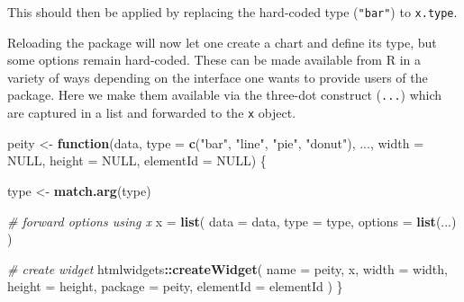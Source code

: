\documentclass[
  10pt,
]{krantz}
\makeatletter
\newenvironment{Shaded}{\begin{snugshade}}{\end{snugshade}}
\newcommand{\AttributeTok}[1]{\textcolor[rgb]{0.61,0.61,0.61}{#1}}
\newcommand{\CommentTok}[1]{\textcolor[rgb]{0.37,0.37,0.37}{\textit{#1}}}
\newcommand{\ControlFlowTok}[1]{\textcolor[rgb]{0.27,0.27,0.27}{\textbf{#1}}}
\newcommand{\DataTypeTok}[1]{\textcolor[rgb]{0.27,0.27,0.27}{#1}}
\newcommand{\KeywordTok}[1]{\textcolor[rgb]{0.27,0.27,0.27}{\textbf{#1}}}
\newcommand{\NormalTok}[1]{#1}
\newcommand{\OperatorTok}[1]{\textcolor[rgb]{0.43,0.43,0.43}{\textbf{#1}}}
\newcommand{\OtherTok}[1]{\textcolor[rgb]{0.37,0.37,0.37}{#1}}
\newcommand{\StringTok}[1]{\textcolor[rgb]{0.5,0.5,0.5}{#1}}
\newcommand{\VariableTok}[1]{\textcolor[rgb]{0,0,0}{#1}}
\newenvironment{kframe}{%
\medskip{}
\setlength{\fboxsep}{.8em}
 \def\at@end@of@kframe{}%
 \ifinner\ifhmode%
  \def\at@end@of@kframe{\end{minipage}}%
  \begin{minipage}{\columnwidth}%
 \fi\fi%
 \def\FrameCommand##1{\hskip\@totalleftmargin \hskip-\fboxsep
 \colorbox{shadecolor}{##1}\hskip-\fboxsep
     \hskip-\linewidth \hskip-\@totalleftmargin \hskip\columnwidth}%
 \MakeFramed {\advance\hsize-\width
   \@totalleftmargin\z@ \linewidth\hsize
   \@setminipage}}%
 {\par\unskip\endMakeFramed%
 \at@end@of@kframe}
\renewenvironment{Shaded}{\begin{kframe}}{\end{kframe}}
\makeatother
\begin{document}
This should then be applied by replacing the hard-coded type (\texttt{"bar"}) to \texttt{x.type}.

\begin{Shaded}
\end{Shaded}

Reloading the package will now let one create a chart and define its type, but some options remain hard-coded. These can be made available from R in a variety of ways depending on the interface one wants to provide users of the package. Here we make them available via the three-dot construct (\texttt{...}) which are captured in a list and forwarded to the \texttt{x} object.

\begin{Shaded}
\begin{Highlighting}[]
\NormalTok{peity <{-}}\StringTok{ }\ControlFlowTok{function}\NormalTok{(data, }\DataTypeTok{type =} \KeywordTok{c}\NormalTok{(}\StringTok{"bar"}\NormalTok{, }\StringTok{"line"}\NormalTok{, }\StringTok{"pie"}\NormalTok{, }\StringTok{"donut"}\NormalTok{), }
\NormalTok{  ..., }\DataTypeTok{width =} \OtherTok{NULL}\NormalTok{, }\DataTypeTok{height =} \OtherTok{NULL}\NormalTok{, }\DataTypeTok{elementId =} \OtherTok{NULL}\NormalTok{) \{}

\NormalTok{  type <{-}}\StringTok{ }\KeywordTok{match.arg}\NormalTok{(type)}

  \CommentTok{\# forward options using x}
\NormalTok{  x =}\StringTok{ }\KeywordTok{list}\NormalTok{(}
    \DataTypeTok{data =}\NormalTok{ data,}
    \DataTypeTok{type =}\NormalTok{ type,}
    \DataTypeTok{options =} \KeywordTok{list}\NormalTok{(...)}
\NormalTok{  )}

  \CommentTok{\# create widget}
\NormalTok{  htmlwidgets}\OperatorTok{::}\KeywordTok{createWidget}\NormalTok{(}
    \DataTypeTok{name =} \StringTok{\textquotesingle{}peity\textquotesingle{}}\NormalTok{,}
\NormalTok{    x,}
    \DataTypeTok{width =}\NormalTok{ width,}
    \DataTypeTok{height =}\NormalTok{ height,}
    \DataTypeTok{package =} \StringTok{\textquotesingle{}peity\textquotesingle{}}\NormalTok{,}
    \DataTypeTok{elementId =}\NormalTok{ elementId}
\NormalTok{  )}
\NormalTok{\}}
\end{Highlighting}
\end{Shaded}
\end{document}
